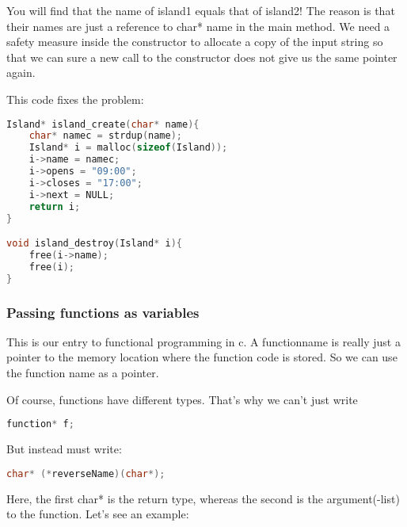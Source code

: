 You will find that the name of island1 equals that of island2!
The reason is that their names are just a reference to char* name in the main method. 
We need a safety measure inside the constructor to allocate a copy of the input string so that we can sure a new call to the constructor does not give us the same pointer again.

This code fixes the problem: 

\begin{lstlisting}[language=c]
Island* island_create(char* name){
    char* namec = strdup(name);
	Island* i = malloc(sizeof(Island));
	i->name = namec;
	i->opens = "09:00";
	i->closes = "17:00";
	i->next = NULL;
	return i;
}

void island_destroy(Island* i){
    free(i->name);
    free(i);
}
\end{lstlisting}



\subsubsection{Passing functions as variables}

This is our entry to functional programming in c.
A functionname is really just a pointer to the memory location where the function code is stored. So we can use the function name as a pointer.

Of course, functions have different types. That's why we can't just write 
\begin{lstlisting}[language=c]
function* f;
\end{lstlisting}

But instead must write:
\begin{lstlisting}[language=c]
char* (*reverseName)(char*);
\end{lstlisting}
Here, the first char* is the return type, whereas the second is the argument(-list) to the function. Let's see an example:


